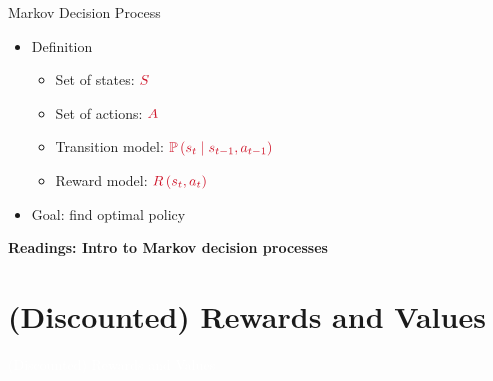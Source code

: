 \documentclass[11pt,table]{beamer}
\begin{document}
\begin{frame}{Markov Decision Process}

\begin{itemize}
    

\item  Definition

\begin{itemize}
     

\item Set of states: $\textcolor{red1}{S}$
\item Set of actions: $\textcolor{red1}{A}$
\item Transition model: $\textcolor{red1}{\mathbb{P}\left(s_{t} \mid s_{t-1}, a_{t-1}\right)}$
\item Reward model: $\textcolor{red1}{R\left(s_{t}, a_{t}\right)}$
\end{itemize}
\item  Goal: \textcolor{red1}{find optimal policy}
\end{itemize}

\vspace{5mm}
\footnotesize
 \textbf{Readings: Intro to Markov decision processes}\\
\citet[][chapter 3]{sutton2018reinforcement}
    
\citet[][chapter 2]{szepesvari2022algorithms}

\citet[][sections 17.1-17.2, 17.4]{russell2016artificial}
    
\citet[][chapters 2, 4, 5]{puterman2014markov}

\end{frame}


\section{(Discounted) Rewards and Values}
{
\begin{frame}
\centering
\Huge
\textcolor{white}{(Discounted) Rewards and Values}
\thispagestyle{empty}
\end{frame}
}
\end{document}
